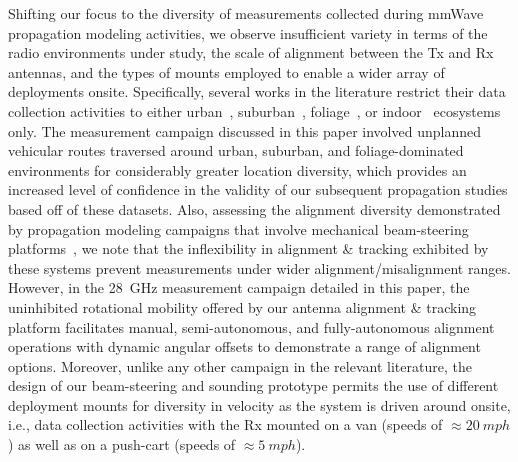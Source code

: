 \documentclass[10pt, twocolumn]{IEEEtran}
\begin{document}
Shifting our focus to the diversity of measurements collected during mmWave propagation modeling activities, we observe insufficient variety in terms of the radio environments under study, the scale of alignment between the Tx and Rx antennas, and the types of mounts employed to enable a wider array of deployments onsite. Specifically, several works in the literature restrict their data collection activities to either urban~\cite{Outdoor28G, PDAPs, QDC_NIST, DopplerHST, V2XBlockages, MacCartneyUrbanHumanBlockage}, suburban~\cite{Purdue, SuburbanGeometryJournal}, foliage~\cite{Foliage, FoliageSimulations}, or indoor~\cite{AgileLink, Harvard, SpatialConsistencyOriginal, SpatialDynamics, Indoor60G, D2DHumanBlockage} ecosystems only. The measurement campaign discussed in this paper involved unplanned vehicular routes traversed around urban, suburban, and foliage-dominated environments for considerably greater location diversity, which provides an increased level of confidence in the validity of our subsequent propagation studies based off of these datasets. Also, assessing the alignment diversity demonstrated by propagation modeling campaigns that involve mechanical beam-steering platforms~\cite{Purdue, Harvard, SpatialConsistencyOriginal, SpatialDynamics, SuburbanGeometryJournal, Outdoor28G, QDC_NIST, D2DHumanBlockage, MacCartneyUrbanHumanBlockage}, we note that the inflexibility in alignment \& tracking exhibited by these systems prevent measurements under wider alignment/misalignment ranges. However, in the \SI{28}{\giga\hertz} measurement campaign detailed in this paper, the uninhibited rotational mobility offered by our antenna alignment \& tracking platform facilitates manual, semi-autonomous, and fully-autonomous alignment operations with dynamic angular offsets to demonstrate a range of alignment options. Moreover, unlike any other campaign in the relevant literature, the design of our beam-steering and sounding prototype permits the use of different deployment mounts for diversity in velocity as the system is driven around onsite, i.e., data collection activities with the Rx mounted on a van (speeds of ${\approx}\SI{20}{mph}$) as well as on a push-cart (speeds of ${\approx}\SI{5}{mph}$).
\end{document}
